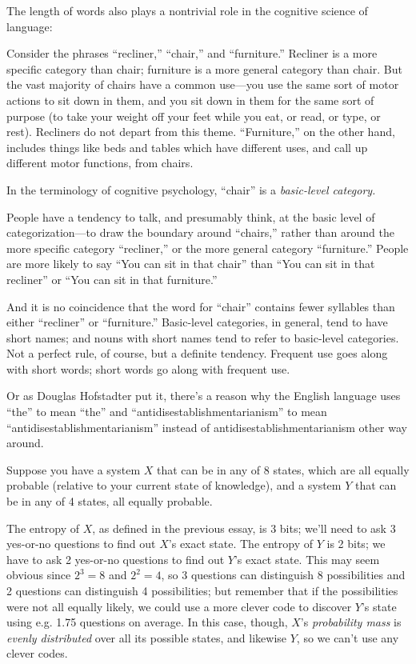 { The length of words also plays a nontrivial role in the cognitive
science of language:


 Consider the phrases
``recliner,''
``chair,'' and
``furniture.'' Recliner is a more
specific category than chair; furniture is a more general category than
chair. But the vast majority of chairs have a common use---you use the
same sort of motor actions to sit down in them, and you sit down in
them for the same sort of purpose (to take your weight off your feet
while you eat, or read, or type, or rest). Recliners do not depart from
this theme. ``Furniture,'' on the
other hand, includes things like beds and tables which have different
uses, and call up different motor functions, from chairs.

{
 In the terminology of cognitive psychology,
``chair'' is a \textit{basic-level
category.}}


 People have a tendency to talk, and presumably think, at the basic
level of categorization---to draw the boundary around
``chairs,'' rather than around the
more specific category ``recliner,''
or the more general category
``furniture.'' People are more
likely to say ``You can sit in that
chair'' than ``You can sit in that
recliner'' or ``You can sit in that
furniture.''


 And it is no coincidence that the word for
``chair'' contains fewer syllables
than either ``recliner'' or
``furniture.'' Basic-level
categories, in general, tend to have short names; and nouns with short
names tend to refer to basic-level categories. Not a perfect rule, of
course, but a definite tendency. Frequent use goes along with short
words; short words go along with frequent use.


 Or as Douglas Hofstadter put it, there's a reason
why the English language uses
``the'' to mean
``the'' and
``antidisestablishmentarianism'' to
mean
``antidisestablishmentarianism''
instead of antidisestablishmentarianism other way around.

\myendsectiontext



 Suppose you have a system $X$ that can be in any of 8 states, which
are all equally probable (relative to your current state of knowledge),
and a system $Y$ that can be in any of 4 states, all equally probable. 


 The entropy of $X$, as defined in the previous essay, is 3 bits;
we'll need to ask 3 yes-or-no questions to find out
$X$'s exact state. The entropy of $Y$ is 2 bits; we have to
ask 2 yes-or-no questions to find out $Y$'s exact state.
This may seem obvious since $2^3 = 8$ and
$2^2 = 4$, so 3 questions can distinguish 8
possibilities and 2 questions can distinguish 4 possibilities; but
remember that if the possibilities were not all equally likely, we
could use a more clever code to discover $Y$'s state
using e.g. 1.75 questions on average. In this case, though,
$X$'s \textit{probability mass} is \textit{evenly
distributed} over all its possible states, and likewise $Y$, so we
can't use any clever codes.


}
